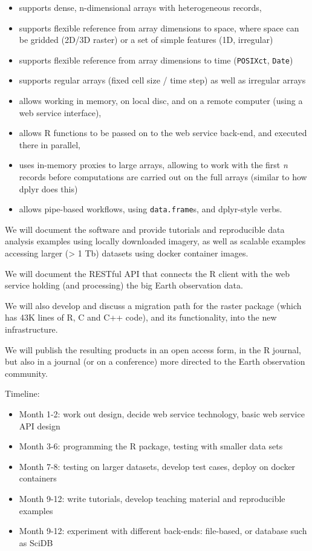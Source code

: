 \begin{itemize}
\tightlist
\item
  supports dense, n-dimensional arrays with heterogeneous records,
\item
  supports flexible reference from array dimensions to space, where
  space can be gridded (2D/3D raster) or a set of simple features (1D,
  irregular)
\item
  supports flexible reference from array dimensions to time
  (\texttt{POSIXct}, \texttt{Date})
\item
  supports regular arrays (fixed cell size / time step) as well as
  irregular arrays
\item
  allows working in memory, on local disc, and on a remote computer
  (using a web service interface),
\item
  allows R functions to be passed on to the web service back-end, and
  executed there in parallel,
\item
  uses in-memory proxies to large arrays, allowing to work with the
  first \emph{n} records before computations are carried out on the full
  arrays (similar to how dplyr does this)
\item
  allows pipe-based workflows, using \texttt{data.frame}s, and
  dplyr-style verbs.
\end{itemize}

We will document the software and provide tutorials and reproducible
data analysis examples using locally downloaded imagery, as well as
scalable examples accessing larger (\textgreater{} 1 Tb) datasets using
docker container images.

We will document the RESTful API that connects the R client with the web
service holding (and processing) the big Earth observation data.

We will also develop and discuss a migration path for the raster package
(which has 43K lines of R, C and C++ code), and its functionality, into
the new infrastructure.

We will publish the resulting products in an open access form, in the R
journal, but also in a journal (or on a conference) more directed to the
Earth observation community.

Timeline:

\begin{itemize}
\tightlist
\item
  Month 1-2: work out design, decide web service technology, basic web
  service API design
\item
  Month 3-6: programming the R package, testing with smaller data sets
\item
  Month 7-8: testing on larger datasets, develop test cases, deploy on
  docker containers
\item
  Month 9-12: write tutorials, develop teaching material and
  reproducible examples
\item
  Month 9-12: experiment with different back-ends: file-based, or
  database such as SciDB
\end{itemize}

